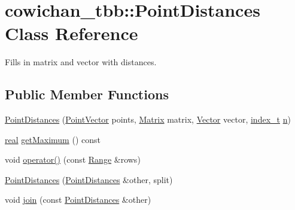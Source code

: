 \hypertarget{classcowichan__tbb_1_1_point_distances}{
\section{cowichan\_\-tbb::PointDistances Class Reference}
\label{classcowichan__tbb_1_1_point_distances}
}
Fills in matrix and vector with distances.  


\subsection*{Public Member Functions}
\begin{CompactItemize}
\item 
\hyperlink{classcowichan__tbb_1_1_point_distances_2c706157dc5644c83b2be957a3e73ee1}{PointDistances} (\hyperlink{class_point}{PointVector} points, \hyperlink{cowichan_8hpp_3fb46f939e55c239fbc95656fc0f3399}{Matrix} matrix, \hyperlink{cowichan_8hpp_02bc1553e241b9b33408482658b3c355}{Vector} vector, \hyperlink{cowichan_8hpp_5b04577d5d21124855deaad298595371}{index\_\-t} \hyperlink{classcowichan__tbb_1_1_point_distances_623f4224db7a141a9f376e8c5bc51b03}{n})
\item 
\hyperlink{cowichan_8hpp_4d521b2c54a1f6312cc8fa04827eaf98}{real} \hyperlink{classcowichan__tbb_1_1_point_distances_bd1df7d38eaed63a1d44c3aab93f16d5}{getMaximum} () const 
\item 
void \hyperlink{classcowichan__tbb_1_1_point_distances_950a8a9aa03229cf8e00eb4ca941f1b2}{operator()} (const \hyperlink{cowichan__tbb_8hpp_8e2057f725b08f3a15513c378a453a47}{Range} \&rows)
\item 
\hyperlink{classcowichan__tbb_1_1_point_distances_417faef7b5cb360d0299cf4faacf9dd7}{PointDistances} (\hyperlink{classcowichan__tbb_1_1_point_distances}{PointDistances} \&other, split)
\item 
void \hyperlink{classcowichan__tbb_1_1_point_distances_db5e32d184099cae39b6a85e1670bea4}{join} (const \hyperlink{classcowichan__tbb_1_1_point_distances}{PointDistances} \&other)
\end{CompactItemize}
